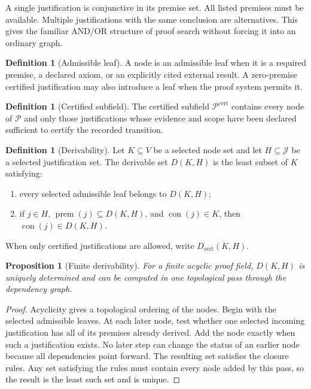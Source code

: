 \documentclass[11pt,oneside]{article}
\newtheorem{proposition}[theorem]{Proposition}
\theoremstyle{definition}
\newtheorem{definition}[theorem]{Definition}
\theoremstyle{remark}
\newcommand{\Pcal}{\mathcal P}
\newcommand{\Jcal}{\mathcal J}
\begin{document}
A single justification is conjunctive in its premise set. All listed premises must be available. Multiple justifications with the same conclusion are alternatives. This gives the familiar AND/OR structure of proof search without forcing it into an ordinary graph.

\begin{definition}[Admissible leaf]
A node is an admissible leaf when it is a required premise, a declared axiom, or an explicitly cited external result. A zero-premise certified justification may also introduce a leaf when the proof system permits it.
\end{definition}

\begin{definition}[Certified subfield]
The certified subfield $\Pcal^{\mathrm{cert}}$ contains every node of $\Pcal$ and only those justifications whose evidence and scope have been declared sufficient to certify the recorded transition.
\end{definition}

\begin{definition}[Derivability]
Let $K\subseteq V$ be a selected node set and let $H\subseteq\Jcal$ be a selected justification set. The derivable set $D(K,H)$ is the least subset of $K$ satisfying:
\begin{enumerate}[label=\textup{(\roman*)}]
\item every selected admissible leaf belongs to $D(K,H)$;
\item if $j\in H$, $\operatorname{prem}(j)\subseteq D(K,H)$, and $\operatorname{con}(j)\in K$, then $\operatorname{con}(j)\in D(K,H)$.
\end{enumerate}
When only certified justifications are allowed, write $D_{\mathrm{cert}}(K,H)$.
\end{definition}

\begin{proposition}[Finite derivability]
For a finite acyclic proof field, $D(K,H)$ is uniquely determined and can be computed in one topological pass through the dependency graph.
\end{proposition}

\begin{proof}
Acyclicity gives a topological ordering of the nodes. Begin with the selected admissible leaves. At each later node, test whether one selected incoming justification has all of its premises already derived. Add the node exactly when such a justification exists. No later step can change the status of an earlier node because all dependencies point forward. The resulting set satisfies the closure rules. Any set satisfying the rules must contain every node added by this pass, so the result is the least such set and is unique.
\end{proof}
\end{document}

